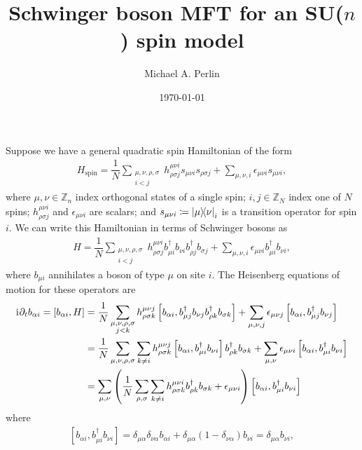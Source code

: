 \documentclass[nofootinbib,notitlepage,11pt]{revtex4-2}
\renewcommand{\t}{\text} %
\newcommand{\f}[2]{\dfrac{#1}{#2}} %
\newcommand{\p}[1]{\left(#1\right)} %
\renewcommand{\sp}[1]{\left[#1\right]} %
\renewcommand{\d}{\partial} %
\renewcommand{\i}{\mathrm{i}\mkern1mu} %
\newcommand{\1}{\mathds{1}}
\newcommand{\ZZ}{\mathbb{Z}}
\begin{document}
\thispagestyle{fancy}

\title{Schwinger boson MFT for an SU($n$) spin model}%
\author{Michael A. Perlin}%
\date{\today}

\maketitle

Suppose we have a general quadratic spin Hamiltonian of the form
\begin{align}
  H_{\t{spin}} = \f1N \sum_{\substack{\mu,\nu,\rho,\sigma\\i<j}}
  h^{\mu\nu i}_{\rho\sigma j} s_{\mu\nu i} s_{\rho\sigma j}
  + \sum_{\mu,\nu,i} \epsilon_{\mu\nu i} s_{\mu\nu i},
\end{align}
where $\mu,\nu\in\ZZ_n$ index orthogonal states of a single spin;
$i,j\in\ZZ_N$ index one of $N$ spins; $h^{\mu\nu i}_{\rho\sigma j}$
and $\epsilon_{\mu\nu i}$ are scalars; and
$s_{\mu\nu i}\coloneqq\op{\mu}{\nu}_i$ is a transition operator for
spin $i$.  We can write this Hamiltonian in terms of Schwinger bosons
as
\begin{align}
  H = \f1N \sum_{\substack{\mu,\nu,\rho,\sigma\\i<j}}
  h^{\mu\nu i}_{\rho\sigma j}
  b_{\mu i}^\dag b_{\nu i} b_{\rho j}^\dag b_{\sigma j}
  + \sum_{\mu,\nu,i} \epsilon_{\mu\nu i} b_{\mu i}^\dag b_{\nu i},
\end{align}
where $b_{\mu i}$ annihilates a boson of type $\mu$ on site $i$.  The
Heisenberg equations of motion for these operators are
\begin{align}
  \i \d_t b_{\alpha i} = \sp{b_{\alpha i}, H}
  &= \f1N \sum_{\substack{\mu,\nu,\rho,\sigma\\j<k}}
  h^{\mu\nu j}_{\rho\sigma k}
  \sp{b_{\alpha i}, b_{\mu j}^\dag b_{\nu j} b_{\rho k}^\dag b_{\sigma k}}
  + \sum_{\mu,\nu,j} \epsilon_{\mu\nu j}
  \sp{b_{\alpha i}, b_{\mu j}^\dag b_{\nu j}} \\
  &= \f1N \sum_{\mu,\nu,\rho,\sigma} \sum_{k\ne i}
  h^{\mu\nu j}_{\rho\sigma k}
  \sp{b_{\alpha i}, b_{\mu i}^\dag b_{\nu i}} b_{\rho k}^\dag b_{\sigma k}
  + \sum_{\mu,\nu} \epsilon_{\mu\nu i}
  \sp{b_{\alpha i}, b_{\mu i}^\dag b_{\nu i}} \\
  &= \sum_{\mu,\nu} \p{\f1N \sum_{\rho,\sigma} \sum_{k\ne i}
    h^{\mu\nu i}_{\rho\sigma k} b_{\rho k}^\dag b_{\sigma k}
    + \epsilon_{\mu\nu i}}
  \sp{b_{\alpha i}, b_{\mu i}^\dag b_{\nu i}}
\end{align}
where
\begin{align}
  \sp{b_{\alpha i}, b_{\mu i}^\dag b_{\nu i}}
  = \delta_{\mu\alpha} \delta_{\nu\alpha} b_{\alpha i}
  + \delta_{\mu\alpha} \p{1-\delta_{\nu\alpha}} b_{\nu i}
  = \delta_{\mu\alpha} b_{\nu i},
\end{align}
\end{document}
